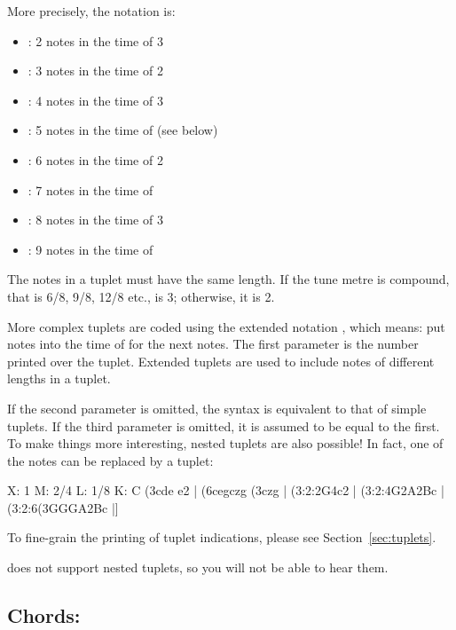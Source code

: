 \documentclass[a4paper,12pt]{book}
\begin{document}
More precisely, the notation is:

\begin{itemize}
  \item {}: 2 notes in the time of 3
  \item {}: 3 notes in the time of 2
  \item {}: 4 notes in the time of 3
  \item {}: 5 notes in the time of  (see below)
  \item {}: 6 notes in the time of 2
  \item {}: 7 notes in the time of 
  \item {}: 8 notes in the time of 3
  \item {}: 9 notes in the time of 
\end{itemize}

The notes in a tuplet must have the same length. If the tune metre is
compound, that is 6/8, 9/8, 12/8 etc.,  is 3; otherwise, it is
2.

More complex tuplets are coded using the extended notation 
, which means: put  notes
into the time of  for the next  notes. The first
parameter is the number printed over the tuplet. Extended tuplets are
used to include notes of different lengths in a tuplet.

If the second parameter is omitted, the syntax is equivalent to that
of simple tuplets. If the third parameter is omitted, it is assumed to
be equal to the first. To make things more interesting, nested tuplets
are also possible! In fact, one of the notes can be replaced by a
tuplet:

\begin{abcsource}
X: 1
M: 2/4
L: 1/8
K: C
(3cde e2 | (6cegczg (3czg |
(3:2:2G4c2 | (3:2:4G2A2Bc | (3:2:6(3GGGA2Bc |]
\end{abcsource}


To fine-grain the printing of tuplet indications, please see
Section~\ref{sec:tuplets}.

\begin{warn}

  \abcMID{} does not support nested tuplets, so you will not be able
  to hear them.

\end{warn}


\subsection{Chords: \icmd{[]}}
\end{document}
